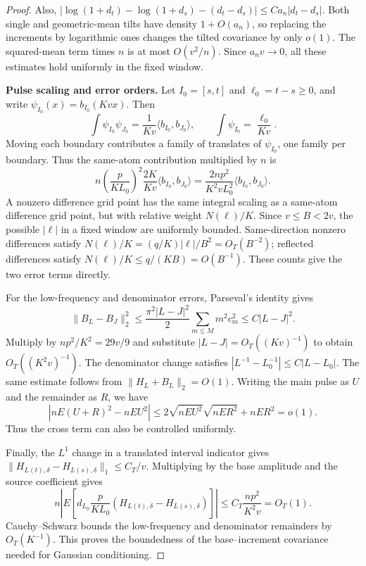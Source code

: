 \documentclass[a4paper,11pt]{article}
\theoremstyle{remark}
\begin{document}
\begin{proof}
Also, $|\log(1+d_t)-\log(1+d_s)-(d_t-d_s)|\le Ca_n|d_t-d_s|$.
Both single and geometric-mean tilts have density $1+O(a_n)$, so replacing the increments by logarithmic ones
changes the tilted covariance by only $o(1)$. The squared-mean term times $n$ is at most $O(v^2/n)$.
Since $a_nv\to0$, all these estimates hold uniformly in the fixed window.

\medskip\noindent\textbf{Pulse scaling and error orders.}
Let $I_0=[s,t]$ and $\ell_0=t-s\ge0$, and write
$\psi_{I_0}(x)=b_{I_0}(Kvx)$. Then
\[
 \int\psi_{I_0}\psi_{J_0}=\frac1{Kv}\langle b_{I_0},b_{J_0}\rangle,
 \qquad \int\psi_{I_0}=\frac{\ell_0}{Kv}.
\]
Moving each boundary contributes a family of translates of $\psi_{I_0}$, one family per boundary.
Thus the same-atom contribution multiplied by $n$ is
\[
 n\left(\frac p{KL_0}\right)^2\frac{2K}{Kv}
 \langle b_{I_0},b_{J_0}\rangle
 =\frac{2np^2}{K^2vL_0^2}\langle b_{I_0},b_{J_0}\rangle.
\]
A nonzero difference grid point has the same integral scaling as a same-atom difference grid point,
but with relative weight $N(\ell)/K$.
Since $v\le B<2v$, the possible $|\ell|$ in a fixed window are uniformly bounded.
Same-direction nonzero differences satisfy
$N(\ell)/K=(q/K)|\ell|/B^2=O_T(B^{-2})$;
reflected differences satisfy $N(\ell)/K\le q/(KB)=O(B^{-1})$.
These counts give the two error terms directly.

For the low-frequency and denominator errors, Parseval's identity gives
\[
 \|B_L-B_J\|_2^2
 \le\frac{\pi^2|L-J|^2}{2}\sum_{m\le M}m^2c_m^2
 \le C|L-J|^2.
\]
Multiply by $np^2/K^2=29v/9$ and substitute $|L-J|=O_T((Kv)^{-1})$ to obtain
$O_T((K^2v)^{-1})$. The denominator change satisfies
$|L^{-1}-L_0^{-1}|\le C|L-L_0|$. The same estimate follows from $\|H_L+B_L\|_2=O(1)$.
Writing the main pulse as $U$ and the remainder as $R$, we have
\[
 |nE(U+R)^2-nEU^2|
 \le2\sqrt{nEU^2}\sqrt{nER^2}+nER^2=o(1).
\]
Thus the cross term can also be controlled uniformly.

Finally, the $L^1$ change in a translated interval indicator gives
$\|H_{L(t),\delta}-H_{L(s),\delta}\|_1\le C_T/v$.
Multiplying by the base amplitude and the source coefficient gives
\[
 n\left|E\left[d_{L_0}\frac p{KL_0}
       (H_{L(t),\delta}-H_{L(s),\delta})\right]\right|
 \le C_T\frac{np^2}{K^2v}=O_T(1).
\]
Cauchy--Schwarz bounds the low-frequency and denominator remainders by $O_T(K^{-1})$.
This proves the boundedness of the base--increment covariance needed for Gaussian conditioning.

\end{proof}
\end{document}
